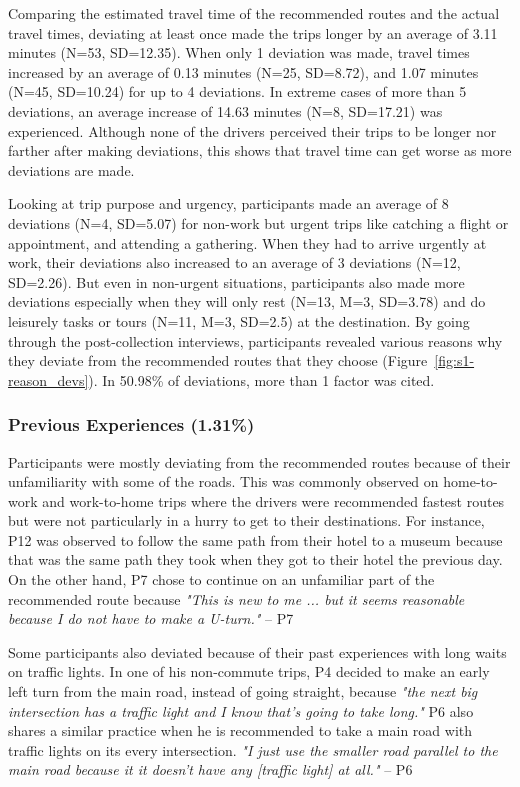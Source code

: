 Comparing the estimated travel time of the recommended routes and the actual travel times, deviating at least once made the trips longer by an average of 3.11 minutes (N=53, SD=12.35). When only 1 deviation was made, travel times increased by an average of 0.13 minutes (N=25, SD=8.72), and 1.07 minutes (N=45, SD=10.24) for up to 4 deviations. In extreme cases of more than 5 deviations, an average increase of 14.63 minutes (N=8, SD=17.21) was experienced. Although none of the drivers perceived their trips to be longer nor farther after making deviations, this shows that travel time can get worse as more deviations are made.

Looking at trip purpose and urgency, participants made an average of 8 deviations (N=4, SD=5.07) for non-work but urgent trips like catching a flight or appointment, and attending a gathering. When they had to arrive urgently at work, their deviations also increased to an average of 3 deviations (N=12, SD=2.26). But even in non-urgent situations, participants also made more deviations especially when they will only rest (N=13, M=3, SD=3.78) and do leisurely tasks or tours (N=11, M=3, SD=2.5) at the destination. By going through the post-collection interviews, participants revealed various reasons why they deviate from the recommended routes that they choose (Figure~\ref{fig:s1-reason_devs}). In 50.98\% of deviations, more than 1 factor was cited.

\subsubsection{Previous Experiences (1.31\%)}
Participants were mostly deviating from the recommended routes because of their unfamiliarity with some of the roads. This was commonly observed on home-to-work and work-to-home trips where the drivers were recommended fastest routes but were not particularly in a hurry to get to their destinations. For instance, P12 was observed to follow the same path from their hotel to a museum because that was the same path they took when they got to their hotel the previous day. On the other hand, P7 chose to continue on an unfamiliar part of the recommended route because \emph{"This is new to me ... but it seems reasonable because I do not have to make a U-turn."} -- P7

Some participants also deviated because of their past experiences with long waits on traffic lights. In one of his non-commute trips, P4 decided to make an early left turn from the main road, instead of going straight, because \emph{"the next big intersection has a traffic light and I know that's going to take long."} P6 also shares a similar practice when he is recommended to take a main road with traffic lights on its every intersection. \emph{"I just use the smaller road parallel to the main road because it it doesn't have any [traffic light] at all."} -- P6


